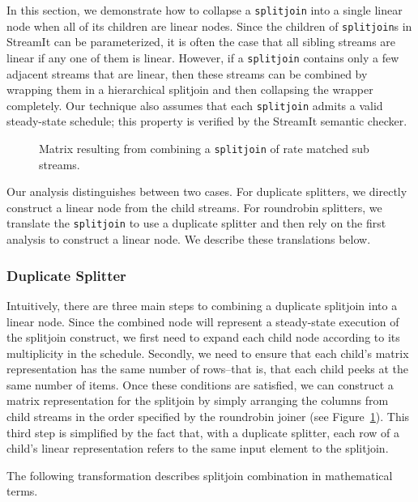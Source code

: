 In this section, we demonstrate how to collapse a {\tt splitjoin} into
a single linear node when all of its children are linear nodes.  Since
the children of {\tt splitjoin}s in StreamIt can be parameterized, it
is often the case that all sibling streams are linear if any one of
them is linear.  However, if a {\tt splitjoin} contains only a few
adjacent streams that are linear, then these streams can be combined
by wrapping them in a hierarchical splitjoin and then collapsing the
wrapper completely.  Our technique also assumes that each 
{\tt splitjoin} admits a valid steady-state schedule; this property is
verified by the StreamIt semantic checker.

\begin{figure}[t]
\center
\epsfxsize=3.2in
\caption{Matrix resulting from combining a {\tt splitjoin} of rate matched sub streams.
\protect\label{fig:splitjoin-duplicate-matrix}}
\vspace{-12pt}
\end{figure}

Our analysis distinguishes between two cases.  For duplicate
splitters, we directly construct a linear node from the child streams.
For roundrobin splitters, we translate the {\tt splitjoin} to use a
duplicate splitter and then rely on the first analysis to construct a
linear node.  We describe these translations below.

\subsubsection{Duplicate Splitter}

Intuitively, there are three main steps to combining a duplicate
splitjoin into a linear node.  Since the combined node will represent
a steady-state execution of the splitjoin construct, we first need to
expand each child node according to its multiplicity in the schedule.
Secondly, we need to ensure that each child's matrix representation
has the same number of rows--that is, that each child peeks at the
same number of items.  Once these conditions are satisfied, we can
construct a matrix representation for the splitjoin by simply
arranging the columns from child streams in the order specified by the
roundrobin joiner (see Figure~\ref{fig:splitjoin-duplicate-matrix}).
This third step is simplified by the fact that, with a duplicate
splitter, each row of a child's linear representation refers to the
same input element to the splitjoin.

The following transformation describes splitjoin combination in
mathematical terms.

